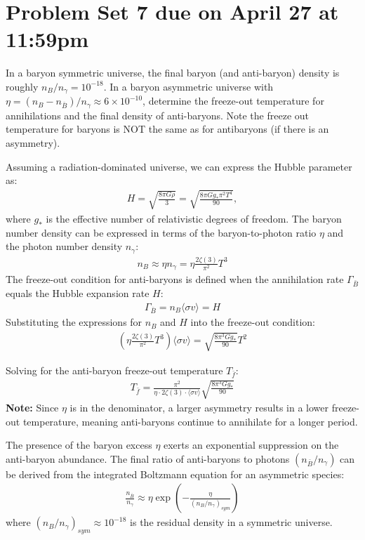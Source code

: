 \section*{Problem Set 7 due on April 27 at 11:59pm}
In a baryon symmetric universe, the final baryon (and anti-baryon) density is roughly $n_B/n_\gamma=10^{-18}$. In a baryon asymmetric universe with $\eta= (n_B-n_{\bar{B}})/n_\gamma \approx 6 \times 10^{-10}$, determine the freeze-out temperature for annihilations and the final density of anti-baryons. Note the freeze out temperature for baryons is NOT the same as for antibaryons (if there is an asymmetry).
\answer{}

Assuming a radiation-dominated universe, we can express the Hubble parameter as:
\begin{align}
    H = \sqrt{\frac{8\pi G \rho}{3}} = \sqrt{\frac{8\pi G g_* \pi^2 T^4}{90}},  
\end{align}
where $g_*$ is the effective number of relativistic degrees of freedom. The baryon number density can be expressed in terms of the baryon-to-photon ratio $\eta$ and the photon number density $n_\gamma$:
\begin{align}
    n_B \approx \eta n_\gamma = \eta \frac{2\zeta(3)}{\pi^2} T^3
\end{align}
The freeze-out condition for anti-baryons is defined when the annihilation rate $\Gamma_{\bar{B}}$ equals the Hubble expansion rate $H$:
\begin{align}
    \Gamma_{\bar{B}} = n_B \langle \sigma v \rangle = H
\end{align}
Substituting the expressions for $n_B$ and $H$ into the freeze-out condition:
\begin{align}
    \left( \eta \frac{2\zeta(3)}{\pi^2} T^3 \right) \langle \sigma v \rangle = \sqrt{\frac{8\pi^3 G g_*}{90}} T^2
\end{align}

Solving for the anti-baryon freeze-out temperature $T_{\bar{f}}$:
\begin{align}
    T_{\bar{f}} = \frac{\pi^2}{\eta \cdot 2\zeta(3) \cdot \langle \sigma v \rangle} \sqrt{\frac{8\pi^3 G g_*}{90}}
\end{align}
\textbf{Note:} Since $\eta$ is in the denominator, a larger asymmetry results in a lower freeze-out temperature, meaning anti-baryons continue to annihilate for a longer period.

The presence of the baryon excess $\eta$ exerts an exponential suppression on the anti-baryon abundance. The final ratio of anti-baryons to photons $(n_{\bar{B}}/n_\gamma)$ can be derived from the integrated Boltzmann equation for an asymmetric species:
\begin{align}
    \frac{n_{\bar{B}}}{n_\gamma} \approx \eta \exp\left( - \frac{\eta}{(n_B/n_\gamma)_{sym}} \right)
\end{align}
where $(n_B/n_\gamma)_{sym} \approx 10^{-18}$ is the residual density in a symmetric universe.

